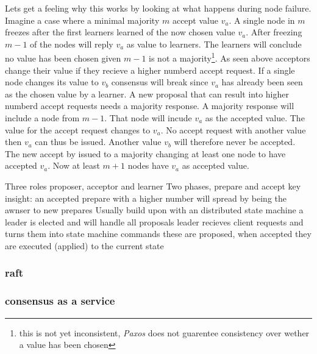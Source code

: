 Lets get a feeling why this works by looking at what happens during node failure. Imagine a case where a minimal majority $m$ accept value $v_a$. A single node in $m$ freezes after the first learners learned of the now chosen value $v_a$. After freezing $m-1$ of the nodes will reply $v_a$ as value to learners. The learners will conclude no value has been chosen given $m-1$ is not a majority\footnote{this is not yet inconsistent, \textit{Paxos} does not guarentee consistency over wether a value has been chosen}. As seen above acceptors change their value if they recieve a higher numberd accept request. If a single node changes its value to $v_b$ consensus will break since $v_a$ has already been seen as the chosen value by a learner. A new proposal that can result into higher numberd accept requests needs a majority response. A majority response will include a node from $m-1$. That node will incude $v_a$ as the accepted value. The value for the accept request changes to $v_a$. No accept request with another value then $v_a$ can thus be issued. Another value $v_b$ will therefore never be accepted. The new accept by issued to a majority changing at least one node to have accepted $v_a$. Now at least $m+1$ nodes have $v_a$ as accepted value.



Three roles proposer, acceptor and learner
Two phases, prepare and accept
 	key insight: an accepted prepare with a higher number will spread by being the awnser to new prepares
Usually build upon with an distributed state machine 
	a leader is elected and will handle all proposals
	leader recieves client requests and turns them into state machine commands
	these are proposed, when accepted they are executed (applied) to the current state
	


\subsubsection*{raft}
\subsubsection*{consensus as a service}
